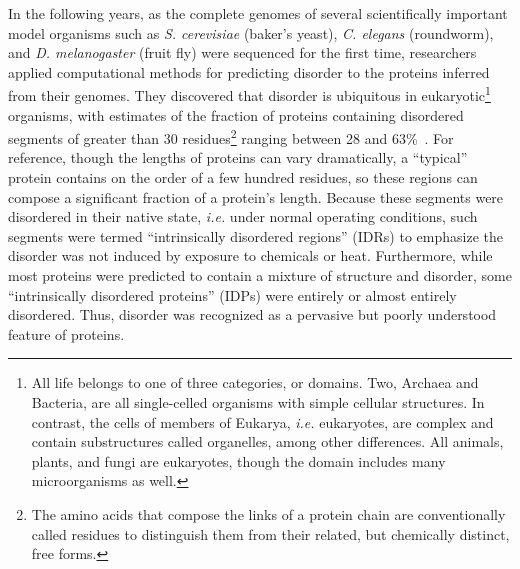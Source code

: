 In the following years, as the complete genomes of several scientifically important model organisms such as \textit{S. cerevisiae} (baker's yeast), \textit{C. elegans} (roundworm), and \textit{D. melanogaster} (fruit fly) were sequenced for the first time, researchers applied computational methods for predicting disorder to the proteins inferred from their genomes. They discovered that disorder is ubiquitous in eukaryotic\footnote{All life belongs to one of three categories, or domains. Two, Archaea and Bacteria, are all single-celled organisms with simple cellular structures. In contrast, the cells of members of Eukarya, \textit{i.e.} eukaryotes, are complex and contain substructures called organelles, among other differences. All animals, plants, and fungi are eukaryotes, though the domain includes many microorganisms as well.} organisms, with estimates of the fraction of proteins containing disordered segments of greater than 30 residues\footnote{The amino acids that compose the links of a protein chain are conventionally called residues to distinguish them from their related, but chemically distinct, free forms.} ranging between 28 and 63\%~\cite{Dunker2000, Ward2004}. For reference, though the lengths of proteins can vary dramatically, a ``typical'' protein contains on the order of a few hundred residues, so these regions can compose a significant fraction of a protein's length. Because these segments were disordered in their native state, \textit{i.e.} under normal operating conditions, such segments were termed ``intrinsically disordered regions'' (IDRs) to emphasize the disorder was not induced by exposure to chemicals or heat. Furthermore, while most proteins were predicted to contain a mixture of structure and disorder, some ``intrinsically disordered proteins'' (IDPs) were entirely or almost entirely disordered. Thus, disorder was recognized as a pervasive but poorly understood feature of proteins.


